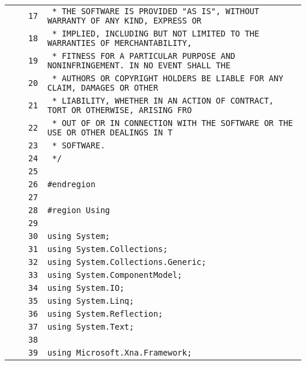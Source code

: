 \documentclass[a4paper,10pt]{article}
\begin{document}
\begin{longtable}[l]{lrrl}
\cellcolor{gray} &  & \verb~17~ & \verb~ * THE SOFTWARE IS PROVIDED "AS IS", WITHOUT WARRANTY OF ANY KIND, EXPRESS OR~\\
\cellcolor{gray} &  & \verb~18~ & \verb~ * IMPLIED, INCLUDING BUT NOT LIMITED TO THE WARRANTIES OF MERCHANTABILITY,~\\
\cellcolor{gray} &  & \verb~19~ & \verb~ * FITNESS FOR A PARTICULAR PURPOSE AND NONINFRINGEMENT. IN NO EVENT SHALL THE~\\
\cellcolor{gray} &  & \verb~20~ & \verb~ * AUTHORS OR COPYRIGHT HOLDERS BE LIABLE FOR ANY CLAIM, DAMAGES OR OTHER~\\
\cellcolor{gray} &  & \verb~21~ & \verb~ * LIABILITY, WHETHER IN AN ACTION OF CONTRACT, TORT OR OTHERWISE, ARISING FRO~\\
\cellcolor{gray} &  & \verb~22~ & \verb~ * OUT OF OR IN CONNECTION WITH THE SOFTWARE OR THE USE OR OTHER DEALINGS IN T~\\
\cellcolor{gray} &  & \verb~23~ & \verb~ * SOFTWARE.~\\
\cellcolor{gray} &  & \verb~24~ & \verb~ */~\\
\cellcolor{gray} &  & \verb~25~ & \verb~~\\
\cellcolor{gray} &  & \verb~26~ & \verb~#endregion~\\
\cellcolor{gray} &  & \verb~27~ & \verb~~\\
\cellcolor{gray} &  & \verb~28~ & \verb~#region Using~\\
\cellcolor{gray} &  & \verb~29~ & \verb~~\\
\cellcolor{gray} &  & \verb~30~ & \verb~using System;~\\
\cellcolor{gray} &  & \verb~31~ & \verb~using System.Collections;~\\
\cellcolor{gray} &  & \verb~32~ & \verb~using System.Collections.Generic;~\\
\cellcolor{gray} &  & \verb~33~ & \verb~using System.ComponentModel;~\\
\cellcolor{gray} &  & \verb~34~ & \verb~using System.IO;~\\
\cellcolor{gray} &  & \verb~35~ & \verb~using System.Linq;~\\
\cellcolor{gray} &  & \verb~36~ & \verb~using System.Reflection;~\\
\cellcolor{gray} &  & \verb~37~ & \verb~using System.Text;~\\
\cellcolor{gray} &  & \verb~38~ & \verb~~\\
\cellcolor{gray} &  & \verb~39~ & \verb~using Microsoft.Xna.Framework;~\\

\end{longtable}
\end{document}
